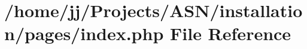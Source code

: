 \hypertarget{installation_2pages_2index_8php}{}\section{/home/jj/\+Projects/\+A\+S\+N/installation/pages/index.php File Reference}
\label{installation_2pages_2index_8php}
